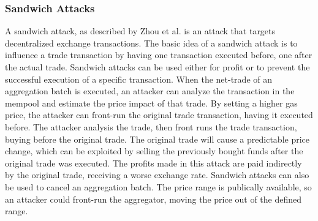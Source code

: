 \documentclass[../../thesis.tex]{subfiles}
\begin{document}
\subsubsection{Sandwich Attacks}
A sandwich attack, as described by Zhou et al. \cite{zhou2020high} is an attack that targets decentralized exchange transactions. The basic idea of a sandwich attack is to influence a trade transaction by having one transaction executed before, one after the actual trade. Sandwich attacks can be used either for profit or to prevent the successful execution of a specific transaction. When the net-trade of an aggregation batch is executed, an attacker can analyze the transaction in the mempool and estimate the price impact of that trade. By setting a higher gas price, the attacker can front-run \cite{adams2020uniswap} the original trade transaction, having it executed before. The attacker analysis the trade, then front runs the trade transaction, buying before the original trade. The original trade will cause a predictable price change, which can be exploited by selling the previously bought funds after the original trade was executed. The profits made in this attack are paid indirectly by the original trade, receiving a worse exchange rate. Sandwich attacks can also be used to cancel an aggregation batch. The price range is publically available, so an attacker could front-run the aggregator, moving the price out of the defined range. 
\end{document}

